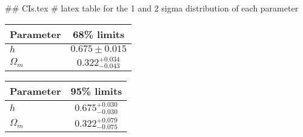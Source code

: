 ## CIs.tex
# latex table for the 1 and 2 sigma distribution of each parameter

\begin{tabular} { l  c}
 Parameter &  68\% limits\\
\hline
{\boldmath$h              $} & $0.675\pm 0.015            $\\
{\boldmath$\Omega_m       $} & $0.322^{+0.034}_{-0.043}   $\\
\hline
\end{tabular}

\begin{tabular} { l  c}
 Parameter &  95\% limits\\
\hline
{\boldmath$h              $} & $0.675^{+0.030}_{-0.030}   $\\
{\boldmath$\Omega_m       $} & $0.322^{+0.079}_{-0.075}   $\\
\hline
\end{tabular}
